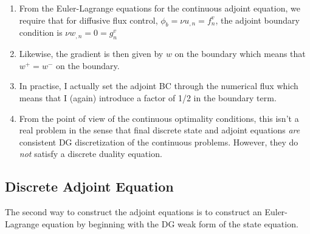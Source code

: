\documentclass[12pt]{article}
\begin{document}
\medskip
{}
\begin{enumerate}
\item From the Euler-Lagrange equations for the continuous adjoint equation,
  we require that for diffusive flux control, $\phi_b = \nu u_{,n} = f^v_n$,
  the adjoint boundary condition is $\nu w_{,n} = 0 = g^v_n$
\item Likewise, the gradient is then given by $w$ on the boundary which means
  that $w^+=w^-$ on the boundary.  
\item In practise, I actually set the adjoint BC through the numerical flux
  which means that I (again) introduce a factor of 1/2 in the boundary term.
\item From the point of view of the continuous optimality conditions, this
  isn't a real problem in the sense that final discrete state and adjoint
  equations {\em are} consistent DG discretization of the continuous problems.
  However, they do {\em not} satisfy a discrete duality equation.
\end{enumerate}

\subsection{Discrete Adjoint Equation}
The second way to construct the adjoint equations is to construct an
Euler-Lagrange equation by beginning with the DG weak form of the state
equation.
\end{document}
